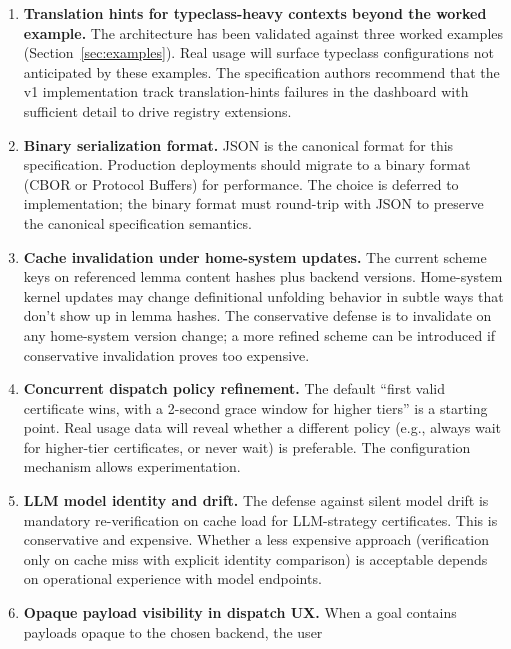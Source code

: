 \documentclass[11pt,letterpaper]{article}
\theoremstyle{definition}
\theoremstyle{remark}
\begin{document}
\begin{enumerate}[leftmargin=2em]
  \item \textbf{Translation hints for typeclass-heavy contexts beyond
        the worked example.} The architecture has been validated
        against three worked examples (Section~\ref{sec:examples}). Real
        usage will surface typeclass configurations not anticipated by
        these examples. The specification authors recommend that the
        v1 implementation track translation-hints failures in the
        dashboard with sufficient detail to drive registry extensions.
  \item \textbf{Binary serialization format.} JSON is the canonical
        format for this specification. Production deployments should
        migrate to a binary format (CBOR or Protocol Buffers) for
        performance. The choice is deferred to implementation; the
        binary format must round-trip with JSON to preserve the
        canonical specification semantics.
  \item \textbf{Cache invalidation under home-system updates.} The
        current scheme keys on referenced lemma content hashes plus
        backend versions. Home-system kernel updates may change
        definitional unfolding behavior in subtle ways that don't show
        up in lemma hashes. The conservative defense is to invalidate
        on any home-system version change; a more refined scheme can
        be introduced if conservative invalidation proves too expensive.
  \item \textbf{Concurrent dispatch policy refinement.} The default
        ``first valid certificate wins, with a 2-second grace window
        for higher tiers'' is a starting point. Real usage data will
        reveal whether a different policy (e.g., always wait for
        higher-tier certificates, or never wait) is preferable. The
        configuration mechanism allows experimentation.
  \item \textbf{LLM model identity and drift.} The defense against
        silent model drift is mandatory re-verification on cache load
        for LLM-strategy certificates. This is conservative and
        expensive. Whether a less expensive approach (verification
        only on cache miss with explicit identity comparison) is
        acceptable depends on operational experience with model
        endpoints.
  \item \textbf{Opaque payload visibility in dispatch UX.} When a goal
        contains payloads opaque to the chosen backend, the user

\end{enumerate}
\end{document}
